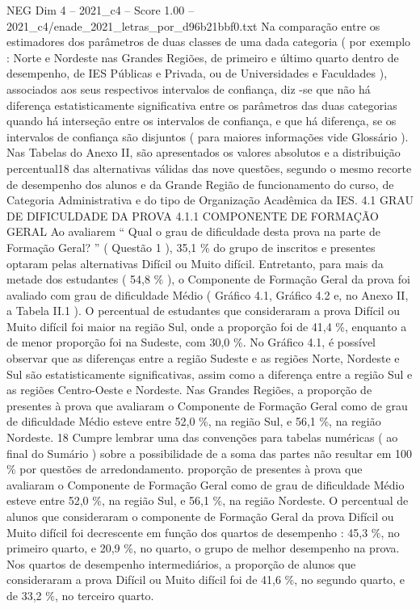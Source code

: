 \begin{textsample}{NEG Dim 4 – 2021\_c4 – Score 1.00 – 2021\_c4/enade\_2021\_letras\_por\_d96b21bbf0.txt}
Na comparação entre os estimadores dos parâmetros de duas classes de uma dada categoria ( por exemplo : Norte e Nordeste nas Grandes Regiões, de primeiro e último quarto dentro de desempenho, de IES Públicas e Privada, ou de Universidades e Faculdades ), associados aos seus respectivos intervalos de confiança, diz -se que não há diferença estatisticamente significativa entre os parâmetros das duas categorias quando há interseção entre os intervalos de confiança, e que há diferença, se os intervalos de confiança são disjuntos ( para maiores informações vide Glossário ).
Nas Tabelas do Anexo II, são apresentados os valores absolutos e a distribuição percentual18 das alternativas válidas das nove questões, segundo o mesmo recorte de desempenho dos alunos e da Grande Região de funcionamento do curso, de Categoria Administrativa e do tipo de Organização Acadêmica da IES. 4.1 GRAU DE DIFICULDADE DA PROVA 4.1.1 COMPONENTE DE FORMAÇÃO GERAL Ao avaliarem “ Qual o grau de dificuldade desta prova na parte de Formação Geral? ” ( Questão 1 ), 35,1 \% do grupo de inscritos e presentes optaram pelas alternativas Difícil ou Muito difícil.
Entretanto, para mais da metade dos estudantes ( 54,8 \% ), o Componente de Formação Geral da prova foi avaliado com grau de dificuldade Médio ( Gráfico 4.1, Gráfico 4.2 e, no Anexo II, a Tabela II.1 ).
O percentual de estudantes que consideraram a prova Difícil ou Muito difícil foi maior na região Sul, onde a proporção foi de 41,4 \%, enquanto a de menor proporção foi na Sudeste, com 30,0 \%.
No Gráfico 4.1, é possível observar que as diferenças entre a região Sudeste e as regiões Norte, Nordeste e Sul são estatisticamente significativas, assim como a diferença entre a região Sul e as regiões Centro-Oeste e Nordeste.
Nas Grandes Regiões, a proporção de presentes à prova que avaliaram o Componente de Formação Geral como de grau de dificuldade Médio esteve entre 52,0 \%, na região Sul, e 56,1 \%, na região Nordeste. 18 Cumpre lembrar uma das convenções para tabelas numéricas ( ao final do Sumário ) sobre a possibilidade de a soma das partes não resultar em 100 \% por questões de arredondamento. proporção de presentes à prova que avaliaram o Componente de Formação Geral como de grau de dificuldade Médio esteve entre 52,0 \%, na região Sul, e 56,1 \%, na região Nordeste.
O percentual de alunos que consideraram o componente de Formação Geral da prova Difícil ou Muito difícil foi decrescente em função dos quartos de desempenho : 45,3 \%, no primeiro quarto, e 20,9 \%, no quarto, o grupo de melhor desempenho na prova.
Nos quartos de desempenho intermediários, a proporção de alunos que consideraram a prova Difícil ou Muito difícil foi de 41,6 \%, no segundo quarto, e de 33,2 \%, no terceiro quarto.

\end{textsample}
